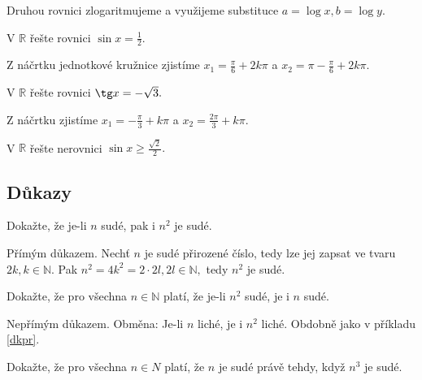 \begin{reseni}
Druhou rovnici zlogaritmujeme a využijeme substituce $a=\log x, b=\log y.$
\end{reseni}

\begin{priklad}
V $\mathbb R$ řešte rovnici $\sin x = \frac{1}{2}.$
\end{priklad}

\begin{reseni}
Z náčrtku jednotkové kružnice zjistíme $x_1 = \frac{\pi}{6}+2k\pi$ a $x_2=\pi-\frac{\pi}{6}+2k\pi.$
\end{reseni}

\begin{priklad}
V $\mathbb R$ řešte rovnici $\tg x = -\sqrt{3}. $
\end{priklad}

\begin{reseni}
Z náčrtku zjistíme $x_1=-\frac{\pi}{3}+k\pi$ a $x_2=\frac{2\pi}{3}+k\pi.$
\end{reseni}

\begin{priklad}
V $\mathbb R$ řešte nerovnici $\sin x \geq \frac{\sqrt{2} }{2}.$
\end{priklad}


\subsection{Důkazy}
\begin{priklad}\label{dkpr}
Dokažte, že je-li $n$ sudé, pak i $n^2$ je sudé.
\end{priklad}

\begin{reseni}
Přímým důkazem. Nechť $n$ je sudé přirozené číslo, tedy lze jej zapsat ve tvaru $2k, k \in \mathbb N.$
Pak $n^2 = 4k^2 = 2\cdot 2l, 2l\in \mathbb N, $ tedy $n^2$ je sudé.
\end{reseni}

\begin{priklad}
Dokažte, že pro všechna $n \in \mathbb N$ platí, že je-li $n^2$ sudé, je i $n$ sudé.
\end{priklad}

\begin{reseni}
Nepřímým důkazem. Obměna: Je-li $n$ liché, je i $n^2$ liché. Obdobně jako v příkladu \ref{dkpr}.
\end{reseni}

\begin{priklad}
Dokažte, že pro všechna $n\in N$ platí, že $n$ je sudé právě tehdy, když $n^3$ je sudé.
\end{priklad}

